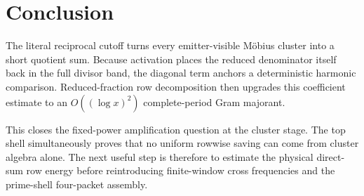 \documentclass[11pt]{article}
\theoremstyle{definition}
\theoremstyle{remark}
\begin{document}
\section{Conclusion}

The literal reciprocal cutoff turns every emitter-visible M\"obius cluster
into a short quotient sum.  Because activation places the reduced denominator
itself back in the full divisor band, the diagonal term anchors a deterministic
harmonic comparison.  Reduced-fraction row decomposition then upgrades this
coefficient estimate to an $O((\log x)^2)$ complete-period Gram majorant.

This closes the fixed-power amplification question at the cluster stage.  The
top shell simultaneously proves that no uniform rowwise saving can come from
cluster algebra alone.  The next useful step is therefore to estimate the
physical direct-sum row energy before reintroducing finite-window cross
frequencies and the prime-shell four-packet assembly.



\end{document}
